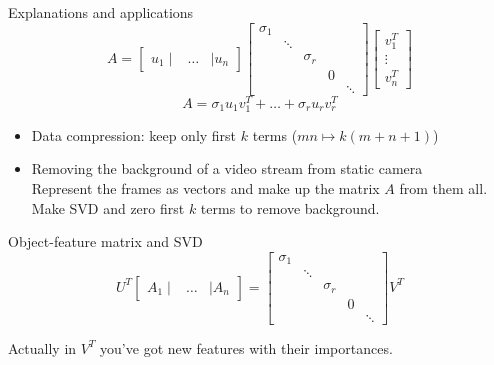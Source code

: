 \documentclass[fullscreen=true, bookmarks=true, hyperref={pdfencoding=unicode}]{beamer}
\begin{document}
\begin{frame}{Explanations and applications}
  \[
  A = \begin{bmatrix}
    u_1 \mid & \dots & \mid u_n
  \end{bmatrix}
  \begin{bmatrix}
   \sigma_1& & & & \\  
        & \ddots & & & \\  
        &   & \sigma_r & & \\  
        & & & 0 &  \\
        & & &   & \ddots
  \end{bmatrix}
  \begin{bmatrix}
    v_1^T \\ \vdots \\ v_n^T
  \end{bmatrix}  
  \]
  \[
  A = \sigma_1 u_1 v_1^T + \dots + \sigma_r u_r v_r^T
  \]

  \begin{itemize}
    \pause\item Data compression: keep only first $k$ terms ($mn \mapsto k(m+n+1) $)
    \pause\item Removing the background of a video stream from static camera \\
    {\small Represent the frames as vectors and make up the matrix $A$ 
    from them all. Make SVD and zero first $k$ terms to remove background.}
  \end{itemize}  
\end{frame}


\begin{frame}{Object-feature matrix and SVD}
  \[
  U^T \begin{bmatrix}
    A_1 \mid & \dots & \mid A_n
  \end{bmatrix} =
  \begin{bmatrix}
   \sigma_1& & & & \\  
        & \ddots & & & \\  
        &   & \sigma_r & & \\  
        & & & 0 &  \\
        & & &   & \ddots
  \end{bmatrix}
  V^T
  \]

  \vspace{0.5cm}
  Actually in $V^T$ you've got new features with their importances.
\end{frame}
\end{document}

